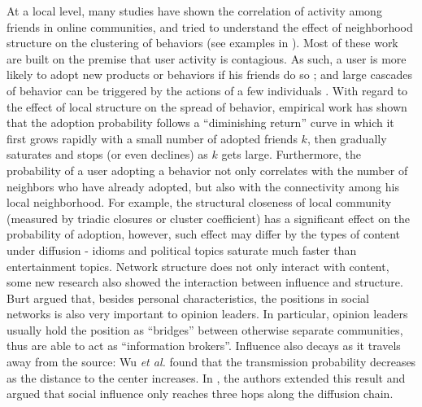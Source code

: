 \documentclass[phd,tocprelim]{cornell}
\begin{document}
At a local level, many studies have shown the correlation of activity among friends in online communities, and tried to understand the effect of neighborhood structure on the clustering of behaviors (see examples in
\cite{Anagnostopoulos-2008,Backstrom:2006,Crandall:2008,Marlow:2006,Romero-2011}). Most of these work are built on the premise that user
activity is contagious. As such, a user is more likely to adopt new
products or behaviors if his friends do so \cite{Backstrom:2006,Leskovec:2007};
and large cascades of behavior can be triggered by the actions of a few
individuals \cite{Gladwell:2002,Rogers:2003}.  With regard to the effect
of local structure on the spread of behavior, 
empirical work has shown that the adoption probability follows a ``diminishing return'' curve in which it first grows rapidly with a small number of adopted friends $k$, then gradually saturates and stops (or even declines) as $k$ gets large\cite{Backstrom:2006,Romero-2011}. Furthermore, the probability of a user adopting a behavior not only correlates with the number of neighbors who have already adopted, but also with the connectivity among his local neighborhood. For example, the structural closeness of local community (measured by triadic closures or cluster coefficient) has a significant effect on the probability of adoption\cite{Backstrom:2006,Romero-2011}, however, such effect may differ by the types of content under diffusion\cite{Romero-2011} - idioms and political topics saturate much faster than entertainment topics. Network structure does not only interact with content, some new research also showed the interaction between influence and structure. Burt\cite{burt-1999} argued that, besides personal characteristics, the positions in social networks is also very important to opinion leaders. In particular, opinion leaders usually hold the position as ``bridges'' between otherwise separate communities, thus are able to act as ``information brokers''. Influence also decays as it travels away from the source: Wu \emph{et al.} found that the transmission probability decreases as the distance to the center increases\cite{wu-2004}. In \cite{Christakis-2007,Christakis-2008,Fowler-2008}, the authors extended this result and argued that social influence only reaches three hops along the diffusion chain. 
\end{document}
